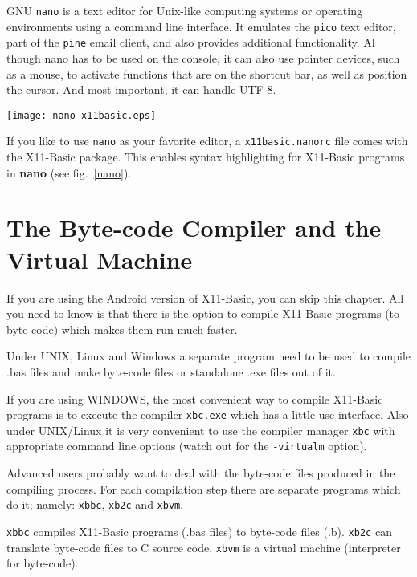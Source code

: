 GNU \verb|nano| is a text editor for Unix-like computing systems or operating 
environments using a command line interface. It emulates the \verb|pico| text
editor, part of the \verb|pine| email client, and also provides additional
functionality. Al though nano has to be used on the console, it can also use
pointer devices, such as a mouse, to activate functions that are on the shortcut
bar, as well as position the cursor. And most important, it can handle UTF-8.

\begin{SCfigure}
\texttt{[image: nano-x11basic.eps]}
\caption{The {\bf nano} editor with syntax highlighting for a X11-Basic program.}
\label{nano}
\end{SCfigure}

If you like to use \verb|nano| as your favorite editor, a 
\verb|x11basic.nanorc| file comes with the X11-Basic package. This enables
syntax highlighting for  X11-Basic programs in {\bf nano} (see fig.~\ref{nano}).



\section{The Byte-code Compiler and the Virtual Machine}

If you are using the Android version of X11-Basic, you can skip this chapter.
All you need to know is that there is the option to compile X11-Basic programs
(to byte-code) which makes them run much faster.

Under UNIX, Linux and Windows a separate program need to be used to compile .bas files and make byte-code files or 
standalone .exe files out of it. 

If you are using WINDOWS, the most convenient way to compile X11-Basic programs
is to execute the compiler \verb|xbc.exe| which has a little use interface. Also
under UNIX/Linux it is very convenient to use the compiler manager \verb|xbc|
with appropriate command line options (watch out for the 
\verb|-virtualm| option). 

Advanced users probably want to deal with the byte-code files produced in the
compiling process. For each compilation step there are separate programs which
do it; namely: \verb|xbbc|, \verb|xb2c| and \verb|xbvm|.

\verb|xbbc| compiles X11-Basic programs (.bas files) to byte-code files (.b).
\verb|xb2c| can translate byte-code files to C source code.
\verb|xbvm| is a virtual machine (interpreter for byte-code).

